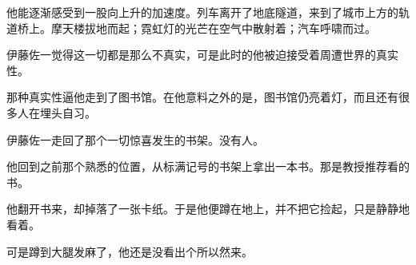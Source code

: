 他能逐渐感受到一股向上升的加速度。列车离开了地底隧道，来到了城市上方的轨道桥上。摩天楼拔地而起；霓虹灯的光芒在空气中散射着；汽车呼啸而过。

伊藤佐一觉得这一切都是那么不真实，可是此时的他被迫接受着周遭世界的真实性。

那种真实性逼他走到了图书馆。在他意料之外的是，图书馆仍亮着灯，而且还有很多人在埋头自习。

伊藤佐一走回了那个一切惊喜发生的书架。没有人。

他回到之前那个熟悉的位置，从标满记号的书架上拿出一本书。那是教授推荐看的书。

他翻开书来，却掉落了一张卡纸。于是他便蹲在地上，并不把它捡起，只是静静地看着。

可是蹲到大腿发麻了，他还是没看出个所以然来。

\newpage
\color{black}
\pagecolor{white}
